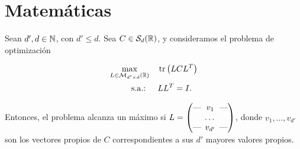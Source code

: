 \documentclass{book}
\begin{document}


\setcounter{tocdepth}{1}

\thispagestyle{plain}
\tableofcontents
\vspace*{\fill}
\doclicenseThis
\newpage
\thispagestyle{plain}


\part{Matemáticas}

\begin{prop} \label{prop:caract_distancias}
	
\end{prop}

\begin{thm} \label{thm:eigen_trace_opt}
	Sean $d',d \in \mathbb{N} $, con $d' \le d$. Sea $C \in \mathcal{S}_d(\mathbb{R})$, y consideramos el problema de optimización
	
	\begin{align*}
	\max_{L \in \mathcal{M}_{d'\times d}(\mathbb{R})} &\quad \operatorname{tr}\left(LCL^T\right)  \\
	\text{s.a.: } &\quad LL^T = I.
	\end{align*}
	
	Entonces, el problema alcanza un máximo si $L = \begin{pmatrix}
	\text{---} \hspace{-0.2cm} & v_1 & \hspace{-0.2cm} \text{---} \\
	& \dots &  \\
	\text{---} \hspace{-0.2cm} & v_{d'} & \hspace{-0.2cm} \text{---}
	\end{pmatrix}$, donde $v_1,\dots,v_{d'}$ son los vectores propios de $C$ correspondientes a sus $d'$ mayores valores propios.
	
	
\end{thm}
\end{document}
